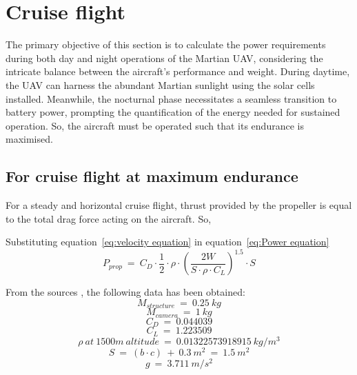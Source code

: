 
\chapter{Cruise flight}
\label{chap: Cruise Flight}

\p The primary objective of this section is to calculate the power requirements during both day and night operations of the Martian UAV, considering the intricate balance between the aircraft's performance and weight. During daytime, the UAV can harness the abundant Martian sunlight using the solar cells installed. Meanwhile, the nocturnal phase necessitates a seamless transition to battery power, prompting the quantification of the energy needed for sustained operation. So, the aircraft must be operated such that its endurance is maximised.

\section{For cruise flight at maximum endurance}

\p For a steady and horizontal cruise flight, thrust provided by the propeller is equal to the total drag force acting on the aircraft. So,


Substituting equation~\ref{eq:velocity equation} in equation~\ref{eq:Power equation}
\[ P_{prop} \ = \  C_D \cdot \frac{1}{2} \cdot \rho \cdot \left(\frac{2W}{S \cdot \rho \cdot C_L }\right)^{1.5} \cdot S \]


From the sources \cite{RE} \cite{Manual} \cite{enwiki:1186424503}, the following data has been obtained:
\[ M_{structure} \ = \ 0.25 \ kg \] \[ M_{camera} \ = \ 1 \ kg \]
\[ C_D \ = \ 0.044039 \] \[ C_L \ = \ 1.223509 \]
\[ \rho \ at \ 1500m \ altitude \ = \ 0.01322573918915 \ kg/m^3 \]
\[S \ = \ ( b \cdot c ) \ + \ 0.3 \ m^2 \ = \ 1.5 \ m^2\]
\[g \ = \ 3.711 \ m/s^2 \]

